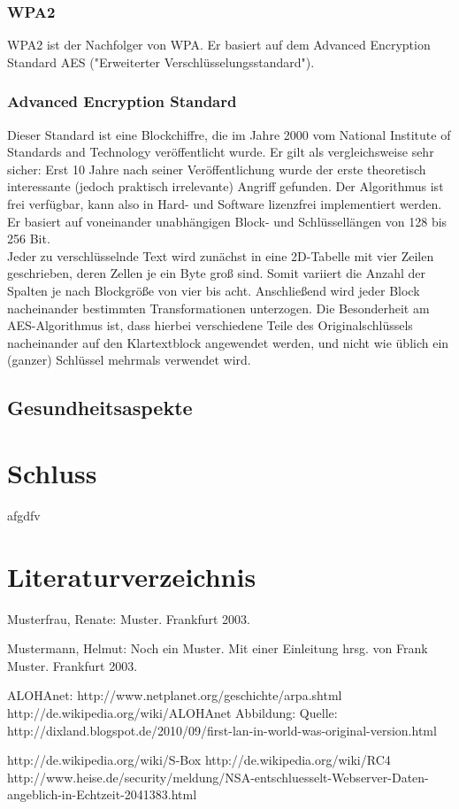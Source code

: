 \documentclass[a4paper,13pt]{scrartcl}
\begin{document}
\subsubsection{WPA2}
WPA2 ist der Nachfolger von WPA. Er basiert auf dem Advanced Encryption Standard AES ("Erweiterter Verschlüsselungsstandard").
\subsubsection{Advanced Encryption Standard}
Dieser Standard ist eine Blockchiffre, die im Jahre 2000 vom National Institute of Standards and Technology veröffentlicht wurde. Er gilt als vergleichsweise sehr sicher: Erst 10 Jahre nach seiner Veröffentlichung wurde der erste theoretisch interessante (jedoch praktisch irrelevante) Angriff gefunden. Der Algorithmus ist frei verfügbar, kann also in Hard- und Software lizenzfrei implementiert werden.\\
Er basiert auf voneinander unabhängigen Block- und Schlüssellängen von 128 bis 256 Bit.\\
Jeder zu verschlüsselnde Text wird zunächst in eine 2D-Tabelle mit vier Zeilen geschrieben, deren Zellen je ein Byte groß sind. Somit variiert die Anzahl der Spalten je nach Blockgröße von vier bis acht. Anschließend wird jeder Block nacheinander bestimmten Transformationen unterzogen. Die Besonderheit am AES-Algorithmus ist, dass hierbei verschiedene Teile des Originalschlüssels nacheinander auf den Klartextblock angewendet werden, und nicht wie üblich ein (ganzer) Schlüssel mehrmals verwendet wird.

\subsection{Gesundheitsaspekte}


\section{Schluss}
afgdfv

\clearpage

\section{Literaturverzeichnis}

Musterfrau, Renate: Muster. Frankfurt 2003.


Mustermann, Helmut: Noch ein Muster. Mit einer Einleitung hrsg. von Frank Muster. Frankfurt 2003.

ALOHAnet: http://www.netplanet.org/geschichte/arpa.shtml
http://de.wikipedia.org/wiki/ALOHAnet
Abbildung: Quelle: http://dixland.blogspot.de/2010/09/first-lan-in-world-was-original-version.html

http://de.wikipedia.org/wiki/S-Box
http://de.wikipedia.org/wiki/RC4
http://www.heise.de/security/meldung/NSA-entschluesselt-Webserver-Daten-angeblich-in-Echtzeit-2041383.html
\end{document}
